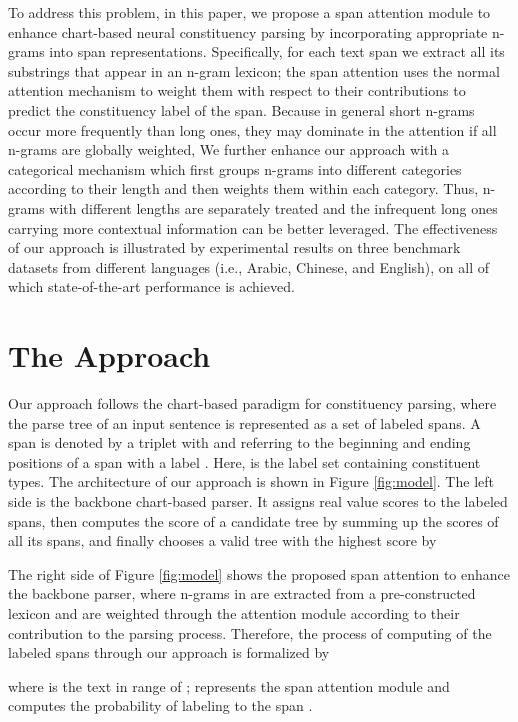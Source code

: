 \documentclass[11pt,a4paper]{article}
\begin{document}
To address this problem, in this paper, we propose a span attention module to enhance chart-based neural constituency parsing by incorporating appropriate n-grams into span representations.
Specifically, for each text span we extract all its substrings that appear in an n-gram lexicon; the span attention uses the normal attention mechanism to weight them with respect to their contributions to predict the constituency label of the span.
Because in general short n-grams occur more frequently than long ones, they may dominate in the attention if all n-grams are globally weighted,
We further enhance our approach with a categorical mechanism which first groups n-grams into different categories according to their length and then weights them within each category.
Thus, n-grams with different lengths are separately treated and the infrequent long ones carrying more contextual information can be better leveraged.
The effectiveness of our approach is illustrated by experimental results on three benchmark datasets from different languages (i.e., Arabic, Chinese, and English), on all of which state-of-the-art performance is achieved. 


\section{The Approach}


Our approach follows the chart-based paradigm for constituency parsing, where the parse tree  of an input sentence  is represented as a set of labeled spans. A span is denoted by a triplet  with  and  referring to the beginning and ending positions of a span with a label .
Here,  is the label set containing  constituent types.
The architecture of our approach is shown in Figure \ref{fig:model}. The left side is the backbone chart-based parser.
It assigns real value scores  to the labeled spans, then computes the score of a candidate tree by summing up the scores of all its spans, and finally chooses a valid tree  with the highest score  by


The right side of Figure \ref{fig:model} shows the proposed span attention to enhance the backbone parser,
where n-grams in  are extracted from a pre-constructed lexicon  and are weighted through the attention module according to their contribution to the parsing process.
Therefore, the process of computing  of the labeled spans through our approach is formalized by

where  is the text in range  of ;  represents the span attention module and  computes the probability of labeling  to the span .
\end{document}
